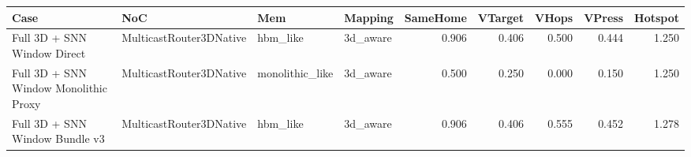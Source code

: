 \begin{tabular}{l l l l r r r r r}
\hline
Case & NoC & Mem & Mapping & SameHome & VTarget & VHops & VPress & Hotspot \\
\hline
Full 3D + SNN Window Direct & MulticastRouter3DNative & hbm\_like & 3d\_aware & 0.906 & 0.406 & 0.500 & 0.444 & 1.250 \\
Full 3D + SNN Window Monolithic Proxy & MulticastRouter3DNative & monolithic\_like & 3d\_aware & 0.500 & 0.250 & 0.000 & 0.150 & 1.250 \\
Full 3D + SNN Window Bundle v3 & MulticastRouter3DNative & hbm\_like & 3d\_aware & 0.906 & 0.406 & 0.555 & 0.452 & 1.278 \\
\hline
\end{tabular}
